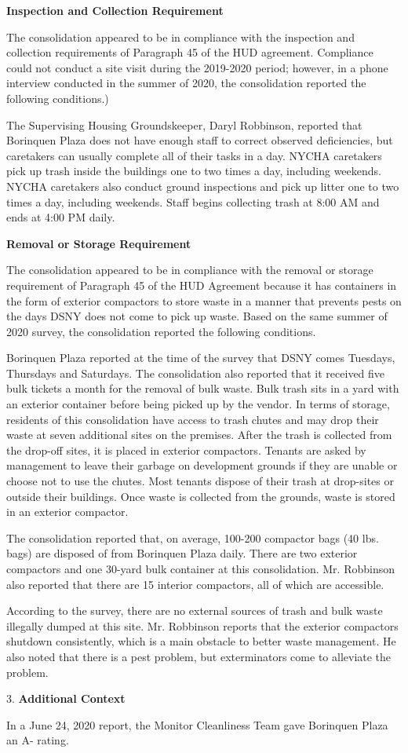 
\textbf{Inspection and Collection Requirement}

The consolidation appeared to be in compliance with the inspection and collection requirements of Paragraph 45 of the HUD agreement. Compliance could not conduct a site visit during the 2019-2020 period; however, in a phone interview conducted in the summer of 2020, the consolidation reported the following conditions.)

The Supervising Housing Groundskeeper, Daryl Robbinson, reported that Borinquen Plaza does not have enough staff to correct observed deficiencies, but caretakers can usually complete all of their tasks in a day. NYCHA caretakers pick up trash inside the buildings one to two times a day, including weekends. NYCHA caretakers also conduct ground inspections and pick up litter one to two times a day, including weekends. Staff begins collecting trash at 8:00 AM and ends at 4:00 PM daily. 

\textbf{Removal or Storage Requirement}

The consolidation appeared to be in compliance with the  removal or storage requirement of Paragraph  45 of the HUD Agreement because it has containers in the form of exterior compactors to store waste in a manner that prevents pests on the days DSNY does not come to pick up waste. Based on the same summer of  2020 survey, the consolidation reported the following conditions.

Borinquen Plaza reported at the time of the survey that DSNY comes Tuesdays, Thursdays and Saturdays. The consolidation also reported that it received five bulk tickets a month for the removal of bulk waste. Bulk trash sits in a yard with an exterior container before being picked up by the vendor. In terms of storage, residents of this consolidation have access to trash chutes and may drop their waste at seven additional sites on the premises. After the trash is collected from the drop-off sites, it is placed in exterior compactors. Tenants are asked by management to leave their garbage on development grounds if they are unable or choose not to use the chutes. Most tenants dispose of their trash at drop-sites or outside their buildings. Once waste is collected from the grounds, waste is stored in an exterior compactor. 

The consolidation reported that, on average, 100-200 compactor bags (40 lbs. bags)  are disposed of from Borinquen Plaza daily. There are two exterior compactors and one 30-yard bulk container at this consolidation. Mr. Robbinson also reported that there are 15 interior compactors, all of which are accessible. 

 According to the survey, there are no external sources of trash and bulk waste illegally dumped at this site. Mr. Robbinson reports that the exterior compactors shutdown consistently, which is a main obstacle to better waste management. He also noted that there is a pest problem, but exterminators come to alleviate the problem.

3. \textbf{Additional Context} 

In a June 24, 2020 report, the Monitor Cleanliness Team gave Borinquen Plaza an A- rating. 